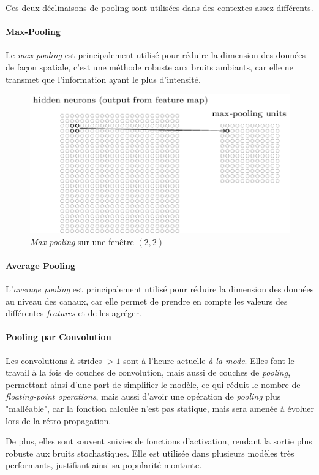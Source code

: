 \documentclass[a4paper, 11pt]{report}
\begin{document}
Ces deux déclinaisons de pooling sont utilisées dans des contextes assez différents.
\paragraph{Max-Pooling}
Le \emph{max pooling} est principalement utilisé pour réduire la dimension des données de façon spatiale, c'est une méthode robuste aux bruits ambiants, car elle ne transmet que l'information ayant le plus d'intensité.
\begin{figure}[H]
	\begin{center}
		\includegraphics[scale=0.6]{Images/Pooling_Layer.png}
		\caption{\emph{Max-pooling} sur une fenêtre $(2,2)$}
	\end{center}
\end{figure}
\paragraph{Average Pooling}
L'\emph{average pooling} est principalement utilisé pour réduire la dimension des données au niveau des canaux, car elle permet de prendre en compte les valeurs des différentes \emph{features} et de les agréger.
\paragraph{Pooling par Convolution}
Les convolutions à strides $>1$ sont à l'heure actuelle \emph{à la mode}. Elles font le travail à la fois de couches de convolution, mais aussi de couches de \emph{pooling}, permettant ainsi d'une part de simplifier le modèle, ce qui réduit le nombre de \emph{floating-point operations}, mais aussi d'avoir une opération de \emph{pooling} plus "malléable", car la fonction calculée n'est pas statique, mais sera amenée à évoluer lors de la rétro-propagation.

De plus, elles sont souvent suivies de fonctions d'activation, rendant la sortie plus robuste aux bruits stochastiques.
Elle est utilisée dans plusieurs modèles très performants, justifiant ainsi sa popularité montante.
\end{document}
